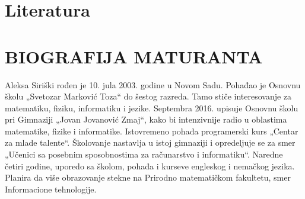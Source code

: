 \documentclass[a4paper,14pt]{article}
\begin{document}
\section{Literatura}
\newpage

\section{BIOGRAFIJA MATURANTA}
Aleksa Siriški rođen je 10. jula 2003. godine u Novom Sadu. Pohađao je Osnovnu školu „Svetozar Marković Toza“ do šestog razreda. Tamo stiče interesovanje za matematiku, fiziku, informatiku i jezike. Septembra 2016. upisuje Osnovnu školu pri Gimnaziji „Jovan Jovanović Zmaj“, kako bi intenzivnije radio u oblastima matematike, fizike i informatike. Istovremeno pohađa programerski kurs „Centar za mlade talente“. Školovanje nastavlja u istoj gimnaziji i opredeljuje se za smer „Učenici sa posebnim sposobnostima za računarstvo i informatiku“. Naredne četiri godine, uporedo sa školom, pohađa i kurseve engleskog i nemačkog jezika. Planira da više obrazovanje stekne na Prirodno matematičkom fakultetu, smer Informacione tehnologije.
\newpage
\end{document}
